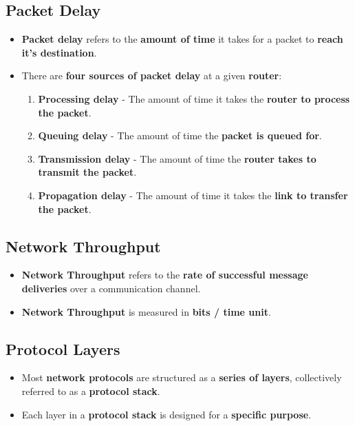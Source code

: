\documentclass{article}
\begin{document}
   \subsection*{Packet Delay}
   \begin{itemize}
       \item \textbf{Packet delay} refers to the \textbf{amount of time} it takes for a packet to \textbf{reach it's destination}.
       \item There are \textbf{four sources of packet delay} at a given \textbf{router}:
       \begin{enumerate}
           \item \textbf{Processing delay} - The amount of time it takes the \textbf{router to process the packet}.
           \item \textbf{Queuing delay} - The amount of time the \textbf{packet is queued for}.
           \item \textbf{Transmission delay} - The amount of time the \textbf{router takes to transmit the packet}.
           \item \textbf{Propagation delay} - The amount of time it takes the \textbf{link to transfer the packet}.
       \end{enumerate}
   \end{itemize}

   \subsection*{Network Throughput}
   \begin{itemize}
       \item \textbf{Network Throughput} refers to the \textbf{rate of successful message deliveries} over a communication channel.
       \item \textbf{Network Throughput} is measured in \textbf{bits / time unit}.
   \end{itemize}

   \subsection*{Protocol Layers}
   \begin{itemize}
       \item Most \textbf{network protocols} are structured as a \textbf{series of layers}, collectively referred to as a \textbf{protocol stack}.
       \item Each layer in a \textbf{protocol stack} is designed for a \textbf{specific purpose}.
   \end{itemize}
\end{document}
